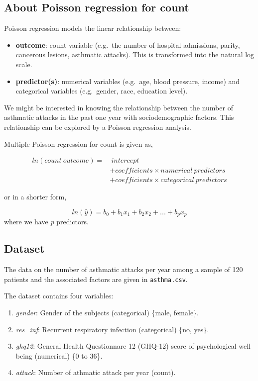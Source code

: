 \documentclass[
  10pt,
]{krantz}
\providecommand{\tightlist}{%
  \setlength{\itemsep}{0pt}\setlength{\parskip}{0pt}}
\begin{document}
\hypertarget{about-poisson-regression-for-count}{%
\subsection{\texorpdfstring{About Poisson regression for count}{About Poisson regression for count}}\label{about-poisson-regression-for-count}}

Poisson regression models the linear relationship between:

\begin{itemize}
\tightlist
\item
  \textbf{outcome}: count variable (e.g.~the number of hospital admissions, parity, cancerous lesions, asthmatic attacks). This is transformed into the natural log scale.
\item
  \textbf{predictor(s)}: numerical variables (e.g.~age, blood pressure, income) and categorical variables (e.g.~gender, race, education level).
\end{itemize}

We might be interested in knowing the relationship between the number of asthmatic attacks in the past one year with sociodemographic factors. This relationship can be explored by a Poisson regression analysis.

Multiple Poisson regression for count is given as,

\[\begin{aligned}
ln(count\ outcome) = &\ intercept \\
& + coefficients \times numerical\ predictors \\
& + coefficients \times categorical\ predictors
\end{aligned}\]

or in a shorter form,

\[ln(\hat y) = b_0 + b_1x_1 + b_2x_2 + ... + b_px_p\]
where we have \emph{p} predictors.

\hypertarget{dataset-3}{%
\subsection{Dataset}\label{dataset-3}}

The data on the number of asthmatic attacks per year among a sample of 120 patients and the associated factors are given in \texttt{asthma.csv}.

The dataset contains four variables:

\begin{enumerate}
\def\labelenumi{\arabic{enumi}.}
\tightlist
\item
  \emph{gender}: Gender of the subjects (categorical) \{male, female\}.
\item
  \emph{res\_inf}: Recurrent respiratory infection (categorical) \{no, yes\}.
\item
  \emph{ghq12}: General Health Questionnare 12 (GHQ-12) score of psychological well being (numerical) \{0 to 36\}.
\item
  \emph{attack}: Number of athmatic attack per year (count).
\end{enumerate}
\end{document}
